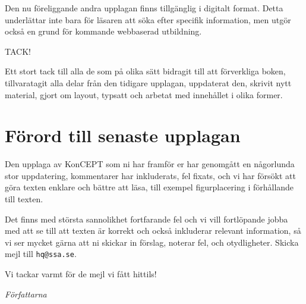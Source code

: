 Den nu föreliggande andra upplagan finns tillgänglig i digitalt format.
Detta underlättar inte bara för läsaren att söka efter specifik information,
men utgör också en grund för kommande webbaserad utbildning.

TACK!

Ett stort tack till alla de som på olika sätt bidragit till att förverkliga
boken, tillvaratagit alla delar från den tidigare upplagan, uppdaterat
den, skrivit nytt material, gjort om layout, typsatt och arbetat med
innehållet i olika former.

\section*{Förord till senaste upplagan}

Den upplaga av KonCEPT som ni har framför er har genomgått en
någorlunda stor uppdatering, kommentarer har inkluderats, fel fixats,
och vi har försökt att göra texten enklare och bättre att läsa, till exempel
figurplacering i förhållande till texten.

Det finns med största sannolikhet fortfarande fel och vi vill
fortlöpande jobba med att se till att texten är korrekt och också
inkluderar relevant information, så vi ser mycket gärna att ni
skickar in förslag, noterar fel, och otydligheter.  Skicka mejl till
\texttt{hq@ssa.se}.

\medskip

Vi tackar varmt för de mejl vi fått hittils!

\bigskip

\noindent\emph{Författarna}
